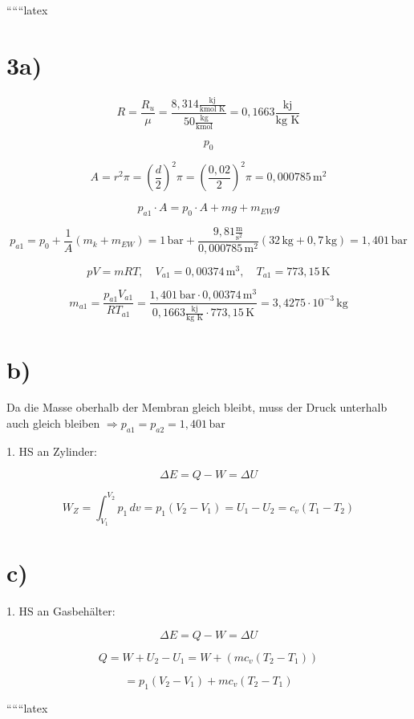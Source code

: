
``````latex


\section*{3a)}

\[
R = \frac{R_u}{\mu} = \frac{8,314 \frac{\text{kj}}{\text{kmol K}}}{50 \frac{\text{kg}}{\text{kmol}}} = 0,1663 \frac{\text{kj}}{\text{kg K}}
\]

\[
p_0
\]

\[
A = r^2 \pi = \left(\frac{d}{2}\right)^2 \pi = \left(\frac{0,02}{2}\right)^2 \pi = 0,000785 \, \text{m}^2
\]

\[
p_{a1} \cdot A = p_0 \cdot A + mg + m_{EW} g
\]

\[
p_{a1} = p_0 + \frac{1}{A} (m_k + m_{EW}) = 1 \, \text{bar} + \frac{9,81 \frac{\text{m}}{\text{s}^2}}{0,000785 \, \text{m}^2} (32 \, \text{kg} + 0,7 \, \text{kg}) = 1,401 \, \text{bar}
\]

\[
pV = mRT, \quad V_{a1} = 0,00374 \, \text{m}^3, \quad T_{a1} = 773,15 \, \text{K}
\]

\[
m_{a1} = \frac{p_{a1} V_{a1}}{RT_{a1}} = \frac{1,401 \, \text{bar} \cdot 0,00374 \, \text{m}^3}{0,1663 \frac{\text{kj}}{\text{kg K}} \cdot 773,15 \, \text{K}} = 3,4275 \cdot 10^{-3} \, \text{kg}
\]

\section*{b)}

Da die Masse oberhalb der Membran gleich bleibt, muss der Druck unterhalb auch gleich bleiben $\Rightarrow p_{a1} = p_{a2} = 1,401 \, \text{bar}$

1. HS an Zylinder:

\[
\Delta E = Q - W = \Delta U
\]

\[
W_{Z} = \int_{V_1}^{V_2} p_1 \, dv = p_1 (V_2 - V_1) = U_1 - U_2 = c_v (T_1 - T_2)
\]

\section*{c)}

1. HS an Gasbehälter:

\[
\Delta E = Q - W = \Delta U
\]

\[
Q = W + U_2 - U_1 = W + (m c_v (T_2 - T_1))
\]

\[
= p_1 (V_2 - V_1) + m c_v (T_2 - T_1)
\]

``````latex


